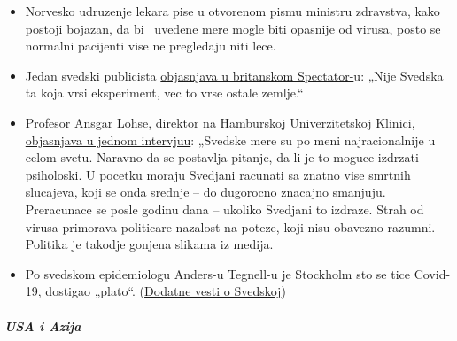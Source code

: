 \begin{itemize}
\tightlist
\item
  Norvesko udruzenje lekara pise u otvorenom pismu ministru zdravstva,
  kako postoji bojazan, da bi ~uvedene mere mogle biti
  \href{https://www.abcnyheter.no/helse-og-livsstil/helse/2020/04/06/195667780/nesten-halvparten-av-sengene-pa-oslo-universitetssykehus-star-tomme}{opasnije
  od virusa}, posto se normalni pacijenti vise ne pregledaju niti lece.
\item
  Jedan svedski publicista
  \href{https://www.spectator.co.uk/article/no-lockdown-please-w-re-swedish}{objasnjava
  u britanskom Spectator-}u: „Nije Svedska ta koja vrsi eksperiment, vec
  to vrse ostale zemlje.``
\item
  Profesor Ansgar Lohse, direktor na Hamburskoj Univerzitetskoj Klinici,
  \href{https://www.abendblatt.de/hamburg/article228880917/uke-professor-shutdown-lohse-deutschland-hamburg-corona-virus-infektion-covid-19-impfstoff-coronavirus-krise-patienten-immunitaet-krankenhaeuser-kontaktverbot-kliniken-infektionsrate.html}{objasnjava
  u jednom intervjuu}: „Svedske mere su po meni najracionalnije u celom
  svetu. Naravno da se postavlja pitanje, da li je to moguce izdrzati
  psiholoski. U pocetku moraju Svedjani racunati sa znatno vise smrtnih
  slucajeva, koji se onda srednje -- do dugorocno znacajno smanjuju.
  Preracunace se posle godinu dana -- ukoliko Svedjani to izdraze. Strah
  od virusa primorava politicare nazalost na poteze, koji nisu obavezno
  razumni. Politika je takodje gonjena slikama iz medija.
\item
  Po svedskom epidemiologu Anders-u Tegnell-u je Stockholm sto se tice
  Covid-19, dostigao „plato``.
  (\href{https://www.thelocal.se/20200310/timeline-how-the-coronavirus-has-developed-in-sweden}{Dodatne
  vesti o Svedskoj})
\end{itemize}

\hypertarget{usa-i-azija}{%
\subparagraph{\texorpdfstring{\textbf{USA i
Azija}}{USA i Azija}}\label{usa-i-azija}}

